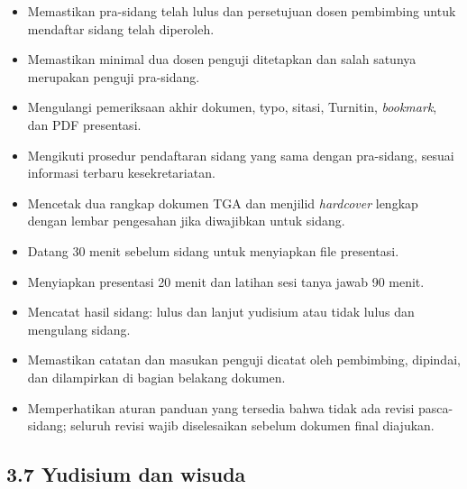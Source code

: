 \documentclass[
  indonesian,
  11pt,
]{article}
\providecommand{\tightlist}{%
  \setlength{\itemsep}{0pt}\setlength{\parskip}{0pt}}
\renewcommand{\tightlist}{%
  \setlength{\itemsep}{0.22em}%
  \setlength{\parskip}{0pt}%
}
\begin{document}
\begin{itemize}
\tightlist
\item[$\square$]
  Memastikan pra-sidang telah lulus dan persetujuan dosen pembimbing
  untuk mendaftar sidang telah diperoleh.
\item[$\square$]
  Memastikan minimal dua dosen penguji ditetapkan dan salah satunya
  merupakan penguji pra-sidang.
\item[$\square$]
  Mengulangi pemeriksaan akhir dokumen, typo, sitasi, Turnitin,
  \emph{bookmark}, dan PDF presentasi.
\item[$\square$]
  Mengikuti prosedur pendaftaran sidang yang sama dengan pra-sidang,
  sesuai informasi terbaru kesekretariatan.
\item[$\square$]
  Mencetak dua rangkap dokumen TGA dan menjilid \emph{hardcover} lengkap
  dengan lembar pengesahan jika diwajibkan untuk sidang.
\item[$\square$]
  Datang 30 menit sebelum sidang untuk menyiapkan file presentasi.
\item[$\square$]
  Menyiapkan presentasi 20 menit dan latihan sesi tanya jawab 90 menit.
\item[$\square$]
  Mencatat hasil sidang: lulus dan lanjut yudisium atau tidak lulus dan
  mengulang sidang.
\item[$\square$]
  Memastikan catatan dan masukan penguji dicatat oleh pembimbing,
  dipindai, dan dilampirkan di bagian belakang dokumen.
\item[$\square$]
  Memperhatikan aturan panduan yang tersedia bahwa tidak ada revisi
  pasca-sidang; seluruh revisi wajib diselesaikan sebelum dokumen final
  diajukan.
\end{itemize}

\subsection{3.7 Yudisium dan wisuda}\label{yudisium-dan-wisuda}
\end{document}
